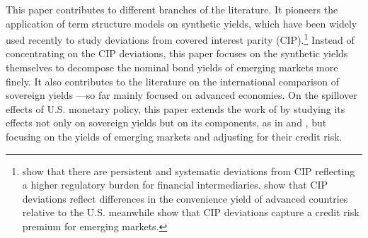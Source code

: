 {This paper contributes to different branches of the literature. 
It pioneers the application of term structure models on synthetic yields, which
have been widely used recently to study deviations from covered interest parity (CIP).\footnote{ \cite*{DuTepperVerdelhan:2018} show that there are persistent and systematic deviations from CIP reflecting a higher regulatory burden for financial intermediaries. 
	\cite*{DuImSchreger:2018JIE} show that CIP deviations reflect differences in the convenience yield of advanced countries relative to the U.S.
	\cite{DuSchreger:2016JoF} meanwhile show that CIP deviations capture a credit risk premium for emerging markets.}
Instead of concentrating on the CIP deviations, this paper focuses on the synthetic yields themselves to decompose the nominal bond yields of emerging markets more finely.
It also contributes to the literature on the international comparison of sovereign yields \citep{DahlquistHasseltoft:2016}---so far mainly focused on advanced economies.
On the spillover effects of U.S. monetary policy, this paper extends the work of \citet*{GilchristYueZakrajsek:2019} by studying its effects not only on sovereign yields but on its components, as in \cite*{CurcuruKaminLiRodriguez:2018} and \cite*{ACDM:2019}, but focusing on the yields of emerging markets and adjusting for their credit risk.

}
